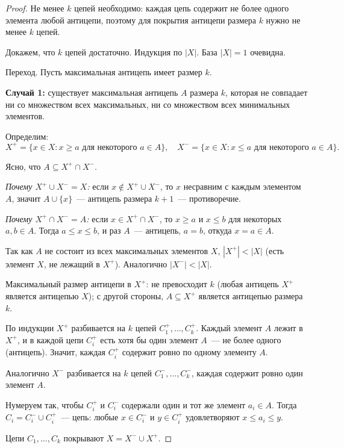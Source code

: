 \documentclass[12pt]{article}
\begin{document}
	\begin{proof}
		Не менее $k$ цепей необходимо: каждая цепь содержит не более одного элемента любой антицепи, поэтому для покрытия антицепи размера $k$ нужно не менее $k$ цепей.
		
		Докажем, что $k$ цепей достаточно. Индукция по $|X|$. База $|X| = 1$ очевидна.
		
		Переход. Пусть максимальная антицепь имеет размер $k$.
		
		\textbf{Случай 1:} существует максимальная антицепь $A$ размера $k$, которая не совпадает ни со множеством всех максимальных, ни со множеством всех минимальных элементов.
		
		Определим:
		\[X^+ = \{x \in X : x \geqslant a \text{ для некоторого } a \in A\}, \quad X^- = \{x \in X : x \leqslant a \text{ для некоторого } a \in A\}.\]
		
		Ясно, что $A \subseteq X^+ \cap X^-$.
		
		\textit{Почему $X^+ \cup X^- = X$:} если $x \notin X^+ \cup X^-$, то $x$ несравним с каждым элементом $A$, значит $A \cup \{x\}$~--- антицепь размера $k + 1$~--- противоречие.
		
		\textit{Почему $X^+ \cap X^- = A$:} если $x \in X^+ \cap X^-$, то $x \geqslant a$ и $x \leqslant b$ для некоторых $a, b \in A$. Тогда $a \leqslant x \leqslant b$, и раз $A$~--- антицепь, $a = b$, откуда $x = a \in A$.
		
		Так как $A$ не состоит из всех максимальных элементов $X$, $|X^+| < |X|$ (есть элемент $X$, не лежащий в $X^+$). Аналогично $|X^-| < |X|$.
		
		Максимальный размер антицепи в $X^+$: не превосходит $k$ (любая антицепь $X^+$ является антицепью $X$); с другой стороны, $A \subseteq X^+$ является антицепью размера $k$.
		
		По индукции $X^+$ разбивается на $k$ цепей $C_1^+, \dots, C_k^+$. Каждый элемент $A$ лежит в $X^+$, и в каждой цепи $C_i^+$ есть хотя бы один элемент $A$~--- не более одного (антицепь). Значит, каждая $C_i^+$ содержит ровно по одному элементу $A$.
		
		Аналогично $X^-$ разбивается на $k$ цепей $C_1^-, \dots, C_k^-$, каждая содержит ровно один элемент $A$.
		
		Нумеруем так, чтобы $C_i^+$ и $C_i^-$ содержали один и тот же элемент $a_i \in A$. Тогда $C_i = C_i^- \cup C_i^+$~--- цепь: любые $x \in C_i^-$ и $y \in C_i^+$ удовлетворяют $x \leqslant a_i \leqslant y$.
		
		Цепи $C_1, \dots, C_k$ покрывают $X = X^- \cup X^+$.
		

\end{proof}
\end{document}
